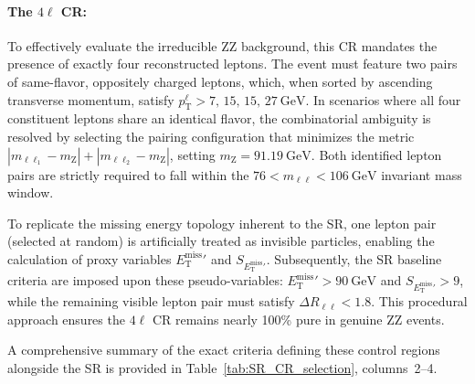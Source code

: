 \paragraph{The $4\ell$ CR:}
To effectively evaluate the irreducible $\text{ZZ}$ background, this CR mandates the presence of exactly four reconstructed leptons. The event must feature two pairs of same-flavor, oppositely charged leptons, which, when sorted by ascending transverse momentum, satisfy $p_{\text{T}}^{\ell} > 7,\,15,\,15,\,27~\text{GeV}$. In scenarios where all four constituent leptons share an identical flavor, the combinatorial ambiguity is resolved by selecting the pairing configuration that minimizes the metric $|m_{\ell\ell_1} - m_{\text{Z}}| + |m_{\ell\ell_2} - m_{\text{Z}}|$, setting $m_{\text{Z}} = 91.19~\text{GeV}$. Both identified lepton pairs are strictly required to fall within the $76 < m_{\ell\ell} < 106~\text{GeV}$ invariant mass window.

To replicate the missing energy topology inherent to the SR, one lepton pair (selected at random) is artificially treated as invisible particles, enabling the calculation of proxy variables ${E_{\text{T}}^{\text{miss}}}'$ and $S_{{E_{\text{T}}^{\text{miss}}}'}$. Subsequently, the SR baseline criteria are imposed upon these pseudo-variables: ${E_{\text{T}}^{\text{miss}}}' > 90~\text{GeV}$ and $S_{{E_{\text{T}}^{\text{miss}}}'} > 9$, while the remaining visible lepton pair must satisfy $\Delta R_{\ell\ell} < 1.8$. This procedural approach ensures the $4\ell$ CR remains nearly 100\% pure in genuine $\text{ZZ}$ events.

A comprehensive summary of the exact criteria defining these control regions alongside the SR is provided in Table~\ref{tab:SR_CR_selection}, columns~2--4.

